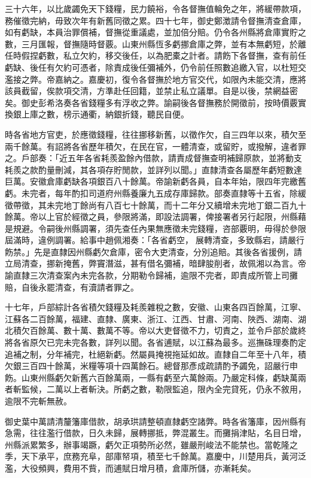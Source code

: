 \begin{pinyinscope}
三十六年，以比歲蠲免天下錢糧，民力饒裕，令各督撫值輪免之年，將緩帶款項，務催徵完納，毋致次年有新舊同徵之累。四十七年，御史鄭澂請令督撫清查倉庫，如有虧缺，本員治罪償補，督撫從重議處，並加倍分賠。仍令各州縣將倉庫實貯之數，三月匯報，督撫隨時督覈。山東州縣恆多虧挪倉庫之弊，並有本無虧短，於離任時假捏虧數，私立欠約，移交後任，以為肥橐之計者。請飭下各督撫，查有前任虧缺、後任有欠約可憑者，除責成後任彌補外，仍令前任照數追繳入官，以杜短交濫接之弊。帝嘉納之。嘉慶初，復令各督撫於地方官交代，如限內未能交清，應將該員截留，俟款項交清，方準赴任回籍，並禁止私立議單。自是以後，禁網益密矣。御史彭希洛奏各省錢糧多有浮收之弊。諭嗣後各督撫務於開徵前，按時價覈實換銀上庫之數，榜示通衢，納銀折錢，聽民自便。

時各省地方官吏，於應徵錢糧，往往挪移新舊，以徵作欠，自三四年以來，積欠至兩千餘萬。有詔將各省歷年積欠，在民在官，一體清查，或留貯，或撥解，違者罪之。戶部奏：「近五年各省耗羨盈餘內借款，請責成督撫查明補歸原款，並將動支耗羨之款酌量刪減，其各項存貯閒款，並詳列以聞。」直隸清查各屬歷年虧短數達巨萬。安徽倉庫虧缺各項銀百八十餘萬。帝諭新虧各員，自本年始，限四年完繳舊虧。未完者，每年酌扣司道府州縣養廉九五成存庫歸款。部奏直隸等十五省，除緩徵帶徵，其未完地丁餘尚有八百七十餘萬，而十二年分又續增未完地丁銀二百九十餘萬。帝以上官於經徵之員，參限將滿，即設法調署，俾接署者另行起限，州縣藉是規避。令嗣後州縣調署，須先查任內果無應徵未完錢糧，咨部覈明，毋得於參限屆滿時，違例調署。給事中趙佩湘奏：「各省虧空，展轉清查，多致縣宕，請嚴行飭禁。」先是直隸因州縣虧欠倉庫，密令大吏清查，分別追賠。其後各省援例，請立局清查，挪新掩舊，弊竇潛滋，甚有借名彌補，暗肆朘削者，故佩湘以為言。帝諭直隸三次清查案內未完各款，分期勒令歸補，逾限不完者，即責成所管上司攤賠，自後永罷清查，有瀆請者罪之。

十七年，戶部綜計各省積欠錢糧及耗羨雜稅之數，安徽、山東各四百餘萬，江寧、江蘇各二百餘萬，福建、直隸、廣東、浙江、江西、甘肅、河南、陜西、湖南、湖北積欠百餘萬、數十萬、數萬不等。帝以大吏督徵不力，切責之，並令戶部於歲終將各省原欠已完未完各數，詳列以聞。各省逋賦，以江蘇為最多。巡撫硃理奏酌定追補之制，分年補完，杜絕新虧。然屬員掩視拖延如故。直隸自二年至十八年，積欠銀三百四十餘萬，米糧等項十四萬餘石。總督那彥成疏請酌予蠲免，詔嚴行申飭。山東州縣虧欠新舊六百餘萬兩，一縣有虧至六萬餘兩。乃嚴定科條，虧缺萬兩者斬監候，二萬以上者斬決。所虧之數，勒限監追，限內全完貸死，仍永不敘用，逾限不完斬無赦。

御史葉中萬請清釐籓庫借款，胡承珙請整頓直隸虧空諸弊。時各省籓庫，因州縣有急需，往往濫行借款，日久未歸，展轉挪抵，弊混叢生。而攤捐津貼，名目日增，州縣派累繁多，辦事竭蹶，虧欠正項勢所必然，雖嚴刑峻法不能禁也。當乾隆之季，天下承平，庶務充阜，部庫帑項，積至七千餘萬。嘉慶中，川楚用兵，黃河泛濫，大役頻興，費用不貲，而逋賦日增月積，倉庫所儲，亦漸耗矣。


\end{pinyinscope}
